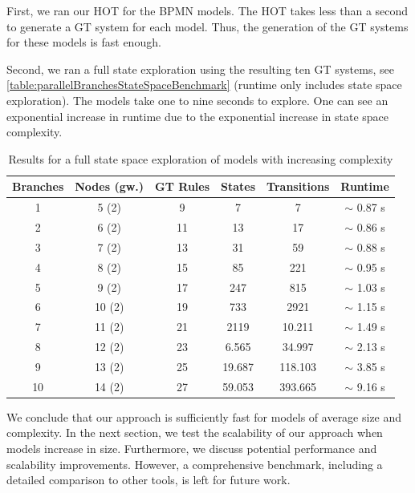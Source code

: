 \documentclass{lmcs} %
\begin{document}
First, we ran our HOT for the BPMN models.
The HOT takes less than a second to generate a GT system for each model.
Thus, the generation of the GT systems for these models is fast enough.

Second, we ran a full state exploration using the resulting ten GT systems, see \autoref{table:parallelBranchesStateSpaceBenchmark} (runtime only includes state space exploration).
The models take one to nine seconds to explore.
One can see an exponential increase in runtime due to the exponential increase in state space complexity.

\begin{table}[ht]
\centering
\caption{Results for a full state space exploration of models with increasing complexity}

\begin{tabular}{| c | c || c || c | c | c |}
 \hline
 Branches & Nodes (gw.) & GT Rules & States & Transitions & Runtime \\
 \hline\hline
 1 & 5 (2) & 9 & 7 & 7 & $\sim$ 0.87 s \\
 \hline
 2 & 6 (2) & 11 & 13 & 17 & $\sim$ 0.86 s \\
 \hline
 3 & 7 (2) & 13 & 31 & 59 & $\sim$ 0.88 s \\
 \hline
 4 & 8 (2) & 15 & 85 & 221 & $\sim$ 0.95 s \\
 \hline
 5 & 9 (2) & 17 & 247 & 815 & $\sim$ 1.03 s \\
 \hline
 6 & 10 (2) & 19 & 733 & 2921 & $\sim$ 1.15 s \\
 \hline
 7 & 11 (2) & 21 & 2119 & 10.211 & $\sim$ 1.49 s \\
 \hline
 8 & 12 (2) & 23 & 6.565 & 34.997 & $\sim$ 2.13 s \\
 \hline
 9 & 13 (2) & 25 & 19.687 & 118.103 & $\sim$ 3.85 s \\
 \hline
 10 & 14 (2) & 27 & 59.053 & 393.665 & $\sim$ 9.16 s \\
 \hline
\end{tabular}
\label{table:parallelBranchesStateSpaceBenchmark}
\end{table}

We conclude that our approach is sufficiently fast for models of average size and complexity.
In the next section, we test the scalability of our approach when models increase in size.
Furthermore, we discuss potential performance and scalability improvements.
However, a comprehensive benchmark, including a detailed comparison to other tools, is left for future work.
\end{document}
